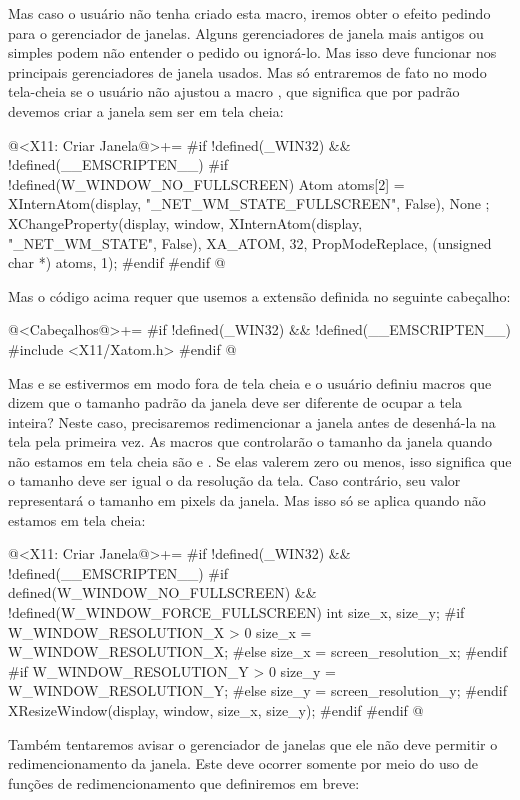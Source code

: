 Mas caso o usuário não tenha criado esta macro, iremos obter o efeito
pedindo para o gerenciador de janelas. Alguns gerenciadores de janela
mais antigos ou simples podem não entender o pedido ou ignorá-lo. Mas
isso deve funcionar nos principais gerenciadores de janela usados. Mas
só entraremos de fato no modo tela-cheia se o usuário não ajustou a
macro , que significa que por
padrão devemos criar a janela sem ser em tela cheia:

\iniciocodigo
@<X11: Criar Janela@>+=
#if !defined(_WIN32) && !defined(__EMSCRIPTEN__)
#if !defined(W_WINDOW_NO_FULLSCREEN)
{
  Atom atoms[2] = { XInternAtom(display, "_NET_WM_STATE_FULLSCREEN",
                                False), None };
  XChangeProperty(display, window, XInternAtom(display, "_NET_WM_STATE",
                                               False),
                  XA_ATOM, 32, PropModeReplace, (unsigned char *) atoms, 1);
}
#endif
#endif
@
\fimcodigo

Mas o código acima requer que usemos a extensão definida no seguinte
cabeçalho:

\iniciocodigo
@<Cabeçalhos@>+=
#if !defined(_WIN32) && !defined(__EMSCRIPTEN__)
#include <X11/Xatom.h>
#endif
@
\fimcodigo

Mas e se estivermos em modo fora de tela cheia e o usuário definiu
macros que dizem que o tamanho padrão da janela deve ser diferente de
ocupar a tela inteira? Neste caso, precisaremos redimencionar a janela
antes de desenhá-la na tela pela primeira vez. As macros que
controlarão o tamanho da janela quando não estamos em tela cheia
são 
e . Se elas valerem zero ou
menos, isso significa que o tamanho deve ser igual o da resolução da
tela. Caso contrário, seu valor representará o tamanho em pixels da
janela. Mas isso só se aplica quando não estamos em tela cheia:

\iniciocodigo
@<X11: Criar Janela@>+=
#if !defined(_WIN32) && !defined(__EMSCRIPTEN__)
#if defined(W_WINDOW_NO_FULLSCREEN) && !defined(W_WINDOW_FORCE_FULLSCREEN)
{
  int size_x, size_y;
#if W_WINDOW_RESOLUTION_X > 0
  size_x = W_WINDOW_RESOLUTION_X;
#else
  size_x = screen_resolution_x;
#endif
#if W_WINDOW_RESOLUTION_Y > 0
  size_y = W_WINDOW_RESOLUTION_Y;
#else
  size_y = screen_resolution_y;
#endif
  XResizeWindow(display, window, size_x, size_y);
}
#endif
#endif
@
\fimcodigo

Também tentaremos avisar o gerenciador de janelas que ele não deve
permitir o redimencionamento da janela. Este deve ocorrer somente por
meio do uso de funções de redimencionamento que definiremos em breve:

